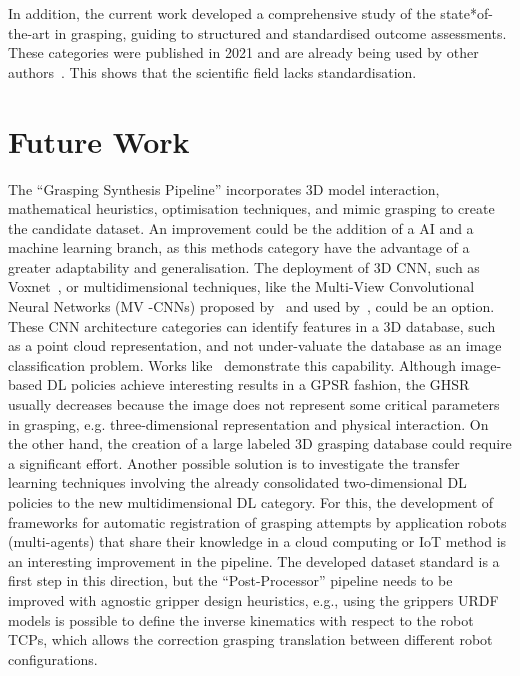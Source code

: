 In addition, the current work developed a comprehensive study of the state*of-the-art in grasping, guiding to structured and standardised outcome assessments. These categories were published in 2021 and are already being used by other authors~\cite{hu2022grasps}. This shows that the scientific field lacks standardisation.

\section{Future Work}

The ``Grasping Synthesis Pipeline'' incorporates 3D model interaction, mathematical heuristics, optimisation techniques, and mimic grasping to create the candidate dataset. An improvement could be the addition of a AI and a machine learning branch, as this methods category have the advantage of a greater adaptability and generalisation. The deployment of 3D \ac{CNN}, such as Voxnet~\cite{maturana2015voxnet}, or multidimensional techniques, like the Multi-View Convolutional Neural Networks (MV -CNNs) proposed by~\cite{su2015multi} and used by~\cite{Mahler2016}, could be an option. These CNN architecture categories can identify features in a 3D database, such as a point cloud representation, and not under-valuate the database as an image classification problem. Works like~\cite{choi2018learning} demonstrate this capability. Although image-based \ac{DL} policies achieve interesting results in a \ac{GPSR} fashion, the \ac{GHSR} usually decreases because the image does not represent some critical parameters in grasping, e.g. three-dimensional representation and physical interaction. On the other hand, the creation of a large labeled 3D grasping database could require a significant effort. Another possible solution is to investigate the transfer learning techniques involving the already consolidated two-dimensional \ac{DL} policies to the new multidimensional \ac{DL} category. For this, the development of frameworks for automatic registration of grasping attempts by application robots (multi-agents) that share their knowledge in a cloud computing or IoT method is an interesting improvement in the pipeline. The developed dataset standard is a first step in this direction, but the ``Post-Processor'' pipeline needs to be improved with agnostic gripper design heuristics, e.g., using the grippers URDF models is possible to define the inverse kinematics with respect to the robot \acp{TCP}, which allows the correction grasping translation between different robot configurations. 

